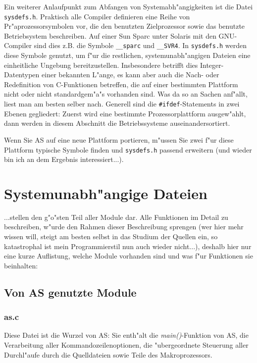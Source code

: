 \documentclass[12pt,a4paper,twoside]{report}
\begin{document}
{Ein weiterer Anlaufpunkt zum Abfangen von Systemabh"angigkeiten ist die
Datei {\tt sysdefs.h}.  Praktisch alle Compiler definieren eine Reihe von
Pr"aprozessorsymbolen vor, die den benutzten Zielprozessor sowie das
benutzte Betriebsystem beschreiben.  Auf einer Sun Sparc unter Solaris
mit den GNU-Compiler sind dies z.B. die Symbole \verb!__sparc! und
\verb!__SVR4!.  In {\tt sysdefs.h} werden diese Symbole genutzt, um f"ur
die restlichen, systemunabh"angigen Dateien eine einheitliche Ungebung
bereitzustellen.  Insbesondere betrifft dies Integer-Datentypen einer
bekannten L"ange, es kann aber auch die Nach- oder Redefinition von
C-Funktionen betreffen, die auf einer bestimmten Plattform nicht oder
nicht standardgem"a"s vorhanden sind.  Was da so an Sachen anf"allt, liest
man am besten selber nach.  Generell sind die \verb!#ifdef!-Statements in
zwei Ebenen gegliedert: Zuerst wird eine bestimmte Prozessorplattform
ausgew"ahlt, dann werden in diesem Abschnitt die Betriebssysteme
auseinandersortiert.  

Wenn Sie AS auf eine neue Plattform portieren, m"ussen Sie zwei f"ur diese
Plattform typische Symbole finden und {\tt sysdefs.h} passend erweitern
(und wieder bin ich an dem Ergebnis interessiert...).  


\section{Systemunabh"angige Dateien}

...stellen den g"o"sten Teil aller Module dar.  Alle Funktionen im Detail
zu beschreiben, w"urde den Rahmen dieser Beschreibung sprengen (wer hier
mehr wissen will, steigt am besten selbst in das Studium der Quellen ein,
so katastrophal ist mein Programmierstil nun auch wieder nicht...),
deshalb hier nur eine kurze Auflistung, welche Module vorhanden sind und
was f"ur Funktionen sie beinhalten:

\subsection{Von AS genutzte Module}

\subsubsection{as.c}

Diese Datei ist die Wurzel von AS: Sie enth"alt die {\em main()}-Funktion
von AS, die Verarbeitung aller Kommandozeilenoptionen, die "ubergeordnete
Steuerung aller Durchl"aufe durch die Quelldateien sowie Teile des
Makroprozessors.  

}
\end{document}

